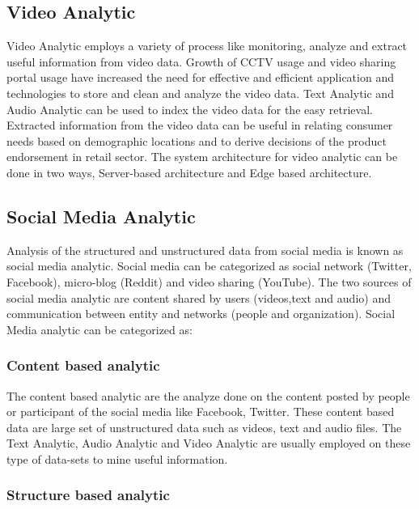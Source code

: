 \documentclass[sigconf]{acmart}
\begin{document}
\subsection{Video Analytic}

Video Analytic employs a variety of process like monitoring, analyze and extract useful information from video data. Growth of CCTV usage and video sharing portal usage have increased the need for effective and efficient application and technologies to store and clean and analyze the video data. Text Analytic and Audio Analytic can be used to index the video data for the easy retrieval. Extracted information from the video data can be useful in relating consumer needs based on demographic locations and to derive decisions of the product endorsement in retail sector. The system architecture for video analytic can be done in two ways, Server-based architecture and Edge based architecture.

\subsection{Social Media Analytic}

Analysis of the structured and unstructured data from social media is known as social media analytic. Social media can be categorized as social network (Twitter, Facebook), micro-blog (Reddit) and video sharing (YouTube). The two sources of social media analytic are content shared by users (videos,text and audio) and communication between entity and networks (people and organization). Social Media analytic can be categorized as:

\subsubsection{Content based analytic \cite{bigdata}}
    
The content based analytic are the analyze done on the content posted by people or participant of the social media like Facebook, Twitter. These content based data are large set of unstructured data such as videos, text and audio files. The Text Analytic, Audio Analytic and Video Analytic are usually employed on these type of data-sets to mine useful information.
    
\subsubsection{Structure based analytic \cite{bigdata}}
\end{document}
